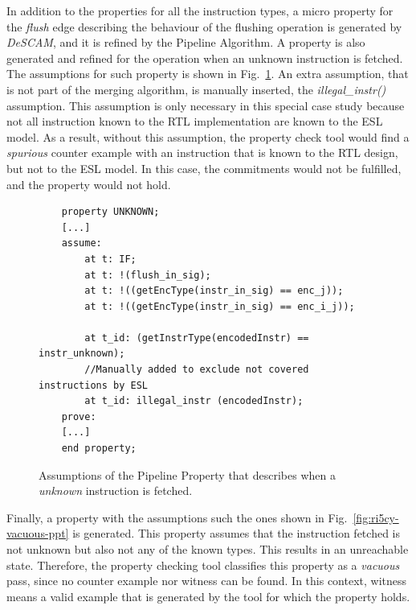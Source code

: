 In addition to the properties for all the instruction types, a micro property for the \textit{flush} edge describing the behaviour of the flushing operation is generated by \textit{DeSCAM}, and it is refined by the Pipeline Algorithm. A property is also generated and refined for the operation when an unknown instruction is fetched. The assumptions for such property is shown in Fig.~\ref{fig:ri5cy-unknown-ppt}. An extra assumption, that is not part of the merging algorithm, is manually inserted, the \textit{illegal\_instr()} assumption. This assumption is only necessary in this special case study because not all instruction known to the RTL implementation are known to the ESL model. As a result, without this assumption, the property check tool would find a \textit{spurious} counter example with an instruction that is known to the RTL design, but not to the ESL model. In this case, the commitments would not be fulfilled, and the property would not hold. 

\begin{figure}[htb!]
    \begin{lstlisting}
    property UNKNOWN;
    [...]
    assume:
        at t: IF;
        at t: !(flush_in_sig);
        at t: !((getEncType(instr_in_sig) == enc_j));
        at t: !((getEncType(instr_in_sig) == enc_i_j));
        
        at t_id: (getInstrType(encodedInstr) == instr_unknown);
        //Manually added to exclude not covered instructions by ESL
        at t_id: illegal_instr (encodedInstr);
    prove:
    [...]
    end property;\end{lstlisting}
    \caption{Assumptions of the Pipeline Property that describes when a \textit{unknown} instruction is fetched.}
    \label{fig:ri5cy-unknown-ppt}
\end{figure}

Finally, a property with the assumptions such the ones shown in Fig.~\ref{fig:ri5cy-vacuous-ppt} is generated. This property assumes that the instruction fetched is not unknown but also not any of the known types. This results in an unreachable state. Therefore, the property checking tool classifies this property as a \textit{vacuous} pass, since no counter example nor witness can be found. In this context, witness means a valid example that is generated by the tool for which the property holds. 

